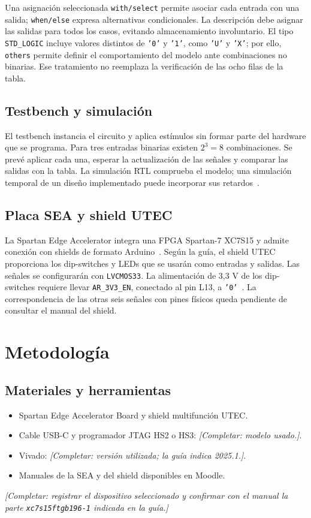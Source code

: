 \documentclass[conference]{IEEEtran}
\newcommand{\pendiente}[1]{\textit{[Completar: #1.]}}
\begin{document}
Una asignación seleccionada \texttt{with/select} permite asociar cada
entrada con una salida; \texttt{when/else} expresa alternativas
condicionales. La descripción debe asignar las salidas para todos
los casos, evitando almacenamiento involuntario. El tipo
\texttt{STD\_LOGIC} incluye valores distintos de \texttt{'0'} y
\texttt{'1'}, como \texttt{'U'} y \texttt{'X'}; por ello,
\texttt{others} permite definir el comportamiento del modelo ante
combinaciones no binarias. Ese tratamiento no reemplaza la
verificación de las ocho filas de la tabla.

\subsection{Testbench y simulación}
El testbench instancia el circuito y aplica estímulos sin formar parte
del hardware que se programa. Para tres entradas binarias existen
$2^3=8$ combinaciones. Se prevé aplicar cada una, esperar la
actualización de las señales y comparar las salidas con la tabla.
La simulación RTL comprueba el modelo; una simulación temporal de
un diseño implementado puede incorporar sus retardos~\cite{simulacion}.

\subsection{Placa SEA y shield UTEC}
La Spartan Edge Accelerator integra una FPGA Spartan-7 XC7S15 y
admite conexión con shields de formato Arduino~\cite{sea}.
Según la guía, el shield UTEC proporciona los dip-switches y LEDs
que se usarán como entradas y salidas. Las señales se configurarán
con \texttt{LVCMOS33}. La alimentación de 3,3 V de los dip-switches
requiere llevar \texttt{AR\_3V3\_EN}, conectado al pin L13, a
\texttt{'0'}~\cite{guia}. La correspondencia de las otras seis señales
con pines físicos queda pendiente de consultar el manual del shield.

\section{Metodología}
\subsection{Materiales y herramientas}
\begin{itemize}
\item Spartan Edge Accelerator Board y shield multifunción UTEC.
\item Cable USB-C y programador JTAG HS2 o HS3: \pendiente{modelo usado}.
\item Vivado: \pendiente{versión utilizada; la guía indica 2025.1}.
\item Manuales de la SEA y del shield disponibles en Moodle.
\end{itemize}
\pendiente{registrar el dispositivo seleccionado y confirmar con el
manual la parte \texttt{xc7s15ftgb196-1} indicada en la guía}
\end{document}

